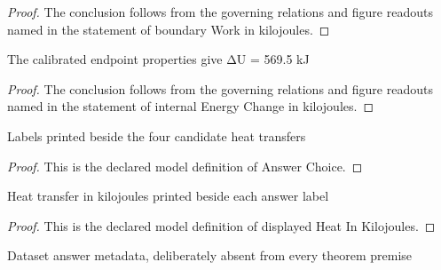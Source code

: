 \begin{proof}
  The conclusion follows from the governing relations and figure readouts named in the statement of boundary Work in kilojoules.
\end{proof}
\begin{lemma}
  \label{lem:physics:phyx-mini-0452:phyxminiproblems-problemphyxmini0452-internalenergychange-in-kilojoules}
  The calibrated endpoint properties give ΔU = 569.5 kJ
\end{lemma}
\begin{proof}
  The conclusion follows from the governing relations and figure readouts named in the statement of internal Energy Change in kilojoules.
\end{proof}
\begin{definition}
  \label{def:physics:phyx-mini-0452:phyxminiproblems-problemphyxmini0452-answerchoice}
  Labels printed beside the four candidate heat transfers
\end{definition}
\begin{proof}
  This is the declared model definition of Answer Choice.
\end{proof}
\begin{definition}
  \label{def:physics:phyx-mini-0452:phyxminiproblems-problemphyxmini0452-displayedheatinkilojoules}
  Heat transfer in kilojoules printed beside each answer label
\end{definition}
\begin{proof}
  This is the declared model definition of displayed Heat In Kilojoules.
\end{proof}
\begin{definition}
  \label{def:physics:phyx-mini-0452:phyxminiproblems-problemphyxmini0452-recordeddatasetanswer}
  Dataset answer metadata, deliberately absent from every theorem premise
\end{definition}
